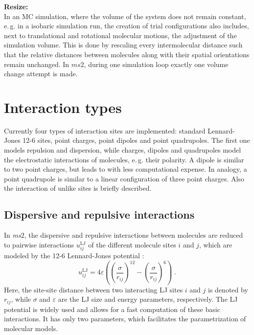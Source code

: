 \textbf{Resize:}\\
In an MC simulation, where the volume of the system does not remain constant, e.\,g. in a isobaric simulation run, the creation of trial configurations also includes, next to translational and rotational molecular motions, the adjustment of the simulation volume. This is done by rescaling every intermolecular distance such that the relative distances between molecules along with their spatial orientations remain unchanged. In $ms$2, during one simulation loop exactly one volume change attempt is made.







\section{Interaction types}
\label{sec:Interaction types}

Currently four types of interaction sites are implemented: standard Lennard-Jones 12-6 sites, point charges, point dipoles and point quadrupoles. The first one models repulsion and dispersion, while charges, dipoles and quadrupoles model the electrostatic interactions of molecules, e.\,g. their polarity. A dipole is similar to two point charges, but leads to with less computational expense. In analogy, a point quadrupole is similar to a linear configuration of three point charges. Also the interaction of unlike sites is briefly described.


\subsection{Dispersive and repulsive interactions}
\label{sec:Dispersive and Repulsive Interaction}


In \textit{ms}2, the dispersive and repulsive interactions between molecules are reduced to pairwise interactions $u^{\text{LJ}}_{ij}$ of the different molecule sites $i$ and $j$, which are modeled by the 12-6 Lennard-Jones potential \parencite{lennard}:
\begin{equation}
u^{\text{LJ}}_{ij}=4 \varepsilon \left(\left(\frac{\sigma}{r_{ij}}\right)^{12}-\left(\frac{\sigma}{r_{ij}}\right)^{6}\right) \;.
\label{eq:DispersiveAndRepulsiveInteractions}
\end{equation}
Here, the site-site distance between two interacting LJ sites $i$ and $j$ is denoted by $r_{ij}$, while $\sigma$ and $\varepsilon$ are the LJ size and energy parameters, respectively. The LJ potential is widely used and allows for a fast computation of these basic interactions. It has only two parameters, which facilitates the parametrization of molecular models.




